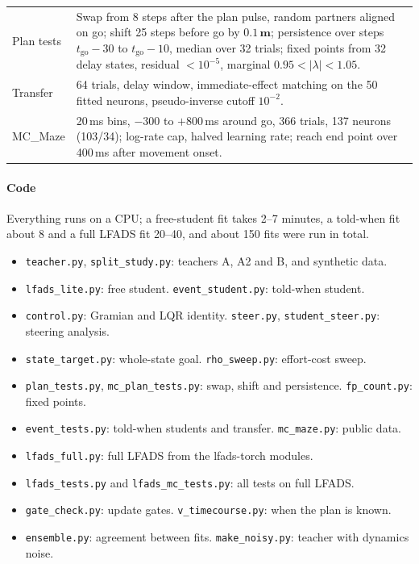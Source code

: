 \documentclass[11pt,a4paper]{article}
\newcommand{\vect}[1]{\bm{#1}}
\begin{document}
\begin{table}[h]
\begin{tabularx}{\linewidth}{@{}p{3.8cm}X@{}}
    Plan tests & Swap from 8 steps after the plan pulse, random partners aligned on go; shift 25 steps before go by $0.1\,\vect m$; persistence over steps $t_{\mathrm{go}}-30$ to $t_{\mathrm{go}}-10$, median over 32 trials; fixed points from 32 delay states, residual $<10^{-5}$, marginal $0.95<|\lambda|<1.05$. \\
    Transfer & 64 trials, delay window, immediate-effect matching on the 50 fitted neurons, pseudo-inverse cutoff $10^{-2}$. \\
    MC\_Maze & 20\,ms bins, $-300$ to $+800$\,ms around go, 366 trials, 137 neurons (103/34); log-rate cap, halved learning rate; reach end point over 400\,ms after movement onset. \\
    \bottomrule
  \end{tabularx}
\end{table}

\paragraph{Code} Everything runs on a CPU; a free-student fit takes 2--7 minutes, a told-when fit about 8 and a full LFADS fit 20--40, and about 150 fits were run in total.
\begin{itemize}[leftmargin=1.2em]
  \item \texttt{teacher.py}, \texttt{split\_study.py}: teachers A, A2 and B, and synthetic data.
  \item \texttt{lfads\_lite.py}: free student. \texttt{event\_student.py}: told-when student.
  \item \texttt{control.py}: Gramian and LQR identity. \texttt{steer.py}, \texttt{student\_steer.py}: steering analysis.
  \item \texttt{state\_target.py}: whole-state goal. \texttt{rho\_sweep.py}: effort-cost sweep.
  \item \texttt{plan\_tests.py}, \texttt{mc\_plan\_tests.py}: swap, shift and persistence. \texttt{fp\_count.py}: fixed points.
  \item \texttt{event\_tests.py}: told-when students and transfer. \texttt{mc\_maze.py}: public data.
  \item \texttt{lfads\_full.py}: full LFADS from the lfads-torch modules.
  \item \texttt{lfads\_tests.py} and \texttt{lfads\_mc\_tests.py}: all tests on full LFADS.
  \item \texttt{gate\_check.py}: update gates. \texttt{v\_timecourse.py}: when the plan is known.
  \item \texttt{ensemble.py}: agreement between fits. \texttt{make\_noisy.py}: teacher with dynamics noise.
\end{itemize}
\end{document}
